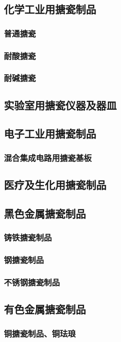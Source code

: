 \documentclass[UTF8]{../../ApplicationUniverse}
\begin{document}
    \subsection{化学工业用搪瓷制品}
        \subsubsection{普通搪瓷}
        \subsubsection{耐酸搪瓷}
        \subsubsection{耐碱搪瓷}
    \subsection{实验室用搪瓷仪器及器皿}
    \subsection{电子工业用搪瓷制品}
        \subsubsection{混合集成电路用搪瓷基板}
    \subsection{医疗及生化用搪瓷制品}
    \subsection{黑色金属搪瓷制品}
        \subsubsection{铸铁搪瓷制品}
        \subsubsection{钢搪瓷制品}
        \subsubsection{不锈钢搪瓷制品}
    \subsection{有色金属搪瓷制品}
        \subsubsection{铜搪瓷制品、铜珐琅}
\end{document}
